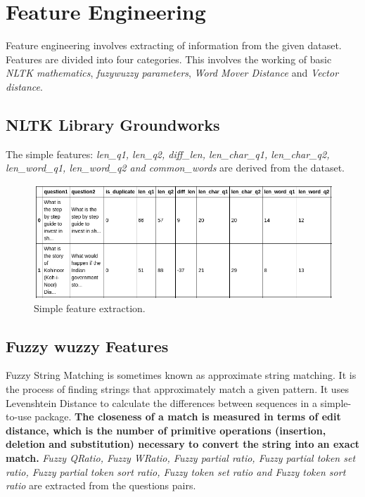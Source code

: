 \section{Feature Engineering}
Feature engineering involves extracting of information from the given dataset. Features are divided into four categories. This involves the working of basic \textit{NLTK mathematics}, \textit{fuzywuzzy parameters}, \textit{Word Mover Distance} and \textit{Vector distance}.

\subsection{NLTK Library Groundworks}
The simple features: \textit{len\_q1, len\_q2, diff\_len, len\_char\_q1, len\_char\_q2, len\_word\_q1, len\_word\_q2 and common\_words} are derived from the dataset.

\begin{figure}[tbh]
\begin{center}
	\includegraphics[width = 5.2in]{images/features_I.png}
	\caption{Simple feature extraction.}
	\label{features_I}
\end{center}
\end{figure}

\subsection{ Fuzzy wuzzy Features }
Fuzzy String Matching is sometimes known as approximate string matching. It is the process of finding strings that approximately match a given pattern. It uses Levenshtein Distance to calculate the differences between sequences in a simple-to-use package. \textbf{The closeness of a match is measured in terms of edit distance, which is the number of primitive operations (insertion, deletion and substitution) necessary to convert the string into an exact match.} \textit{ Fuzzy QRatio, Fuzzy WRatio, Fuzzy partial ratio, Fuzzy partial token set ratio, Fuzzy partial token sort ratio, Fuzzy token set ratio and Fuzzy token sort ratio} are extracted from the questions pairs.

